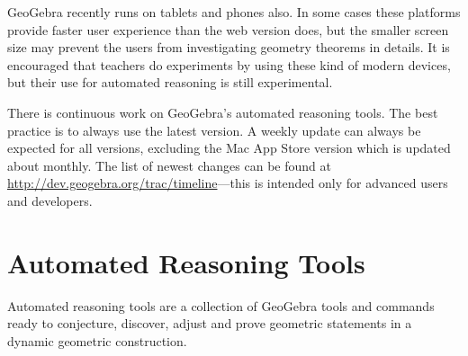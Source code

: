 \documentclass{article}
\begin{document}
GeoGebra recently runs on tablets and phones also. In some cases these platforms provide faster user experience than the web version does, but the smaller screen size may prevent the users from investigating geometry theorems in details. It is encouraged that teachers do experiments by using these kind of modern devices, but their use for automated reasoning is still experimental.

There is continuous work on GeoGebra's automated reasoning tools. The best practice is to always use the latest version. A weekly update can always be expected for all versions, excluding the Mac App Store version which is updated about monthly. The list of newest changes can be found at \url{http://dev.geogebra.org/trac/timeline}---this is intended only for advanced users and developers.

\section{Automated Reasoning Tools}

Automated reasoning tools are a collection of GeoGebra tools and commands ready to conjecture, discover, adjust and prove geometric statements in a dynamic geometric construction.
\end{document}
